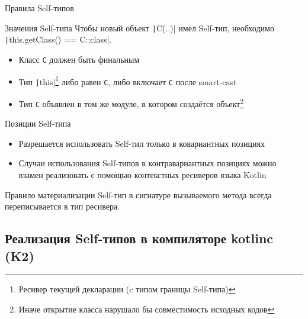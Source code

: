 \documentclass[aspectratio=169,usenames,dvipsnames]{beamer}
\begin{document}
    \begin{frame}[fragile]{Правила Self-типов}

        \begin{block}{Значения Self-типа}
            Чтобы новый объект \texttt|C(..)| имел Self-тип, необходимо \texttt|this.getClass() == C::class|.
            \begin{itemize}
                \item Класс \texttt{C} должен быть финальным
                \item Тип \texttt|this|\footnote{Ресивер текущей декларации (c типом границы Self-типа)} либо равен \texttt{С}, либо включает \texttt{C} после smart-cast
                \item Тип \texttt{C} объявлен в том же модуле, в котором создаётся объект\footnote{Иначе открытие класса нарушало бы совместимость исходных кодов}
            \end{itemize}
        \end{block}

        \pause

        \begin{block}{Позиции Self-типа}
            \begin{itemize}
                \item Разрешается использовать Self-тип только в ковариантных позициях
                \item Случаи использования Self-типов в контравариантных позициях можно взамен реализовать с помощью контекстных ресиверов языка Kotlin
            \end{itemize}
        \end{block}

        \pause

        \begin{block}{Правило материализации}
            Self-тип в сигнатуре вызываемого метода всегда переписывается в тип ресивера.
        \end{block}
    \end{frame}


    \subsection{Реализация Self-типов в компиляторе kotlinc (K2)}
\end{document}
